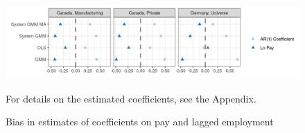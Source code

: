 \begin{figure} [H]
\centering
\includegraphics[width=\linewidth]{r-graphs/fig_estimates3.png}
\caption{Bias in estimates of coefficients on  pay and lagged employment\label{fig:estimates3}} 
\begin{minipage}{0.48\linewidth}
{\footnotesize For details on the estimated coefficients, see the Appendix. \par}
\end{minipage}
\end{figure}
